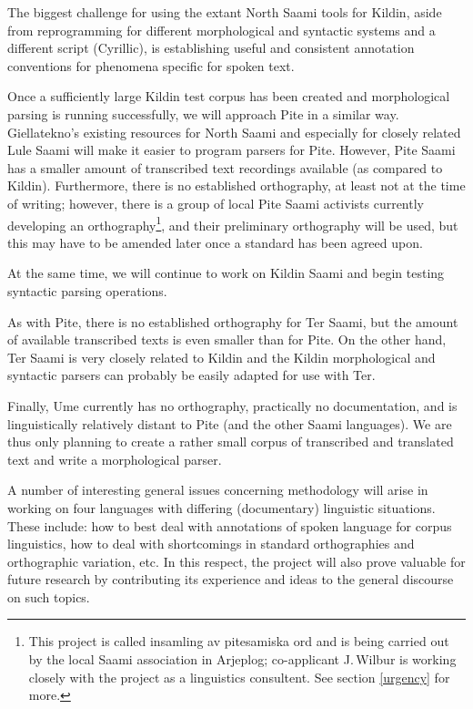 \documentclass[a4paper,12pt]{article}
\begin{document}
The biggest challenge for using the extant North Saami tools for Kildin, aside from reprogramming for different morphological and syntactic systems and a different script (Cyrillic), is establishing useful and consistent annotation conventions for phenomena specific for spoken text.

Once a sufficiently large Kildin test corpus has been created and morphological parsing is running successfully, we will approach Pite in a similar way. Giellatekno's existing resources for North Saami and especially for closely related Lule Saami will make it easier to program parsers for Pite. However, Pite Saami has a smaller amount of transcribed text recordings available (as compared to Kildin). Furthermore, there is no established orthography, at least not at the time of writing; however, there is a group of local Pite Saami activists currently developing an orthography\footnote{This project is called insamling av pitesamiska ord and is being carried out by the local Saami association in Arjeplog; co-applicant J.\,Wilbur is working closely with the project as a linguistics consultent. See section \ref{urgency} for more.}, and their preliminary orthography will be used, but this may have to be amended later once a standard has been agreed upon.

At the same time, we will continue to work on Kildin Saami and begin testing syntactic parsing operations.

As with Pite, there is no established orthography for Ter Saami, but the amount of available transcribed texts is even smaller than for Pite.  On the other hand, Ter Saami is very closely related to Kildin and the Kildin morphological and syntactic parsers can probably be easily adapted for use with Ter.

Finally, Ume currently has no orthography, practically no documentation, and is linguistically relatively distant to Pite (and the other Saami languages). We are thus only planning to create a rather small corpus of transcribed and translated text and write a morphological parser.

A number of interesting general issues concerning methodology will arise in working on four languages with differing (documentary) linguistic situations. These include: how to best deal with annotations of spoken language for corpus linguistics, how to deal with shortcomings in standard orthographies and orthographic variation, etc. In this respect, the project will also prove valuable for future research by contributing its experience and ideas to the general discourse on such topics.
\end{document}
